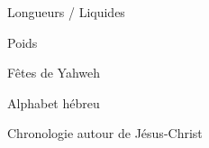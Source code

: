 \documentclass[11pt]{book}
\begin{document}
\clearpage
\begin{center}Longueurs / Liquides\end{center}\clearpage
\clearpage
\begin{center}Poids\end{center}\clearpage
\clearpage
\begin{center}Fêtes de Yahweh\end{center}\clearpage
\clearpage
\begin{center}Alphabet hébreu\end{center}\clearpage
\clearpage
\begin{center}Chronologie autour de Jésus-Christ\end{center}\clearpage
\end{document}
